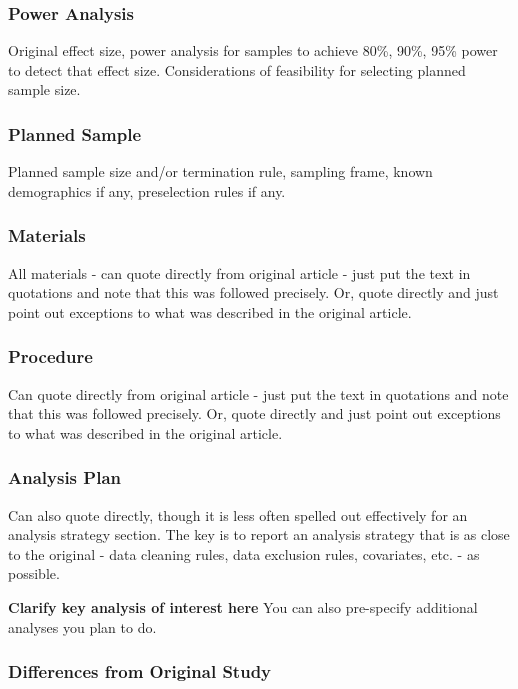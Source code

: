 \documentclass[
  letterpaper,
  DIV=11,
  numbers=noendperiod]{scrartcl}
\begin{document}
\subsubsection{Power Analysis}\label{power-analysis}

Original effect size, power analysis for samples to achieve 80\%, 90\%,
95\% power to detect that effect size. Considerations of feasibility for
selecting planned sample size.

\subsubsection{Planned Sample}\label{planned-sample}

Planned sample size and/or termination rule, sampling frame, known
demographics if any, preselection rules if any.

\subsubsection{Materials}\label{materials}

All materials - can quote directly from original article - just put the
text in quotations and note that this was followed precisely. Or, quote
directly and just point out exceptions to what was described in the
original article.

\subsubsection{Procedure}\label{procedure}

Can quote directly from original article - just put the text in
quotations and note that this was followed precisely. Or, quote directly
and just point out exceptions to what was described in the original
article.

\subsubsection{Analysis Plan}\label{analysis-plan}

Can also quote directly, though it is less often spelled out effectively
for an analysis strategy section. The key is to report an analysis
strategy that is as close to the original - data cleaning rules, data
exclusion rules, covariates, etc. - as possible.

\textbf{Clarify key analysis of interest here} You can also pre-specify
additional analyses you plan to do.

\subsubsection{Differences from Original
Study}\label{differences-from-original-study}
\end{document}
